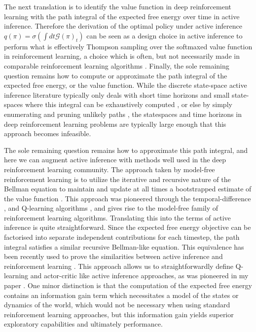 The next translation is to identify the value function in deep reinforcement learning with the path integral of the expected free energy over time in active inference. Therefore the derivation of the optimal policy under active inference $q(\pi) = \sigma(\int dt \mathcal{G}(\pi)_t)$ can be seen as a design choice in active inference to perform what is effectively Thompson sampling over the softmaxed value function in reinforcement learning, a choice which is often, but not necessarily made in comparable reinforcement learning algorithms \citep{osband2015bootstrapped}. Finally, the sole remaining question remains how to compute or approximate the path integral of the expected free energy, or the value function. While the discrete state-space active inference literature typically only deals with short time horizons and small state-spaces where this integral can be exhaustively computed \citep{da2020active}, or else by simply enumerating and pruning unlikely paths \citep{friston2020sophisticated}, the statespaces and time horizons in deep reinforcement learning problems are typically large enough that this approach becomes infeasible. 

The sole remaining question remains how to approximate this path integral, and here we can augment active inference with methods well used in the deep reinforcement learning community. The approach taken by model-free reinforcement learning is to utilize the iterative and recursive nature of the Bellman equation to maintain and update at all times a bootstrapped estimate of the value function \citep{kaelbling1996reinforcement,mnih2013playing}. This approach was pioneered through the temporal-difference \citep{sutton1988learning}, and Q-learning algorithms \citep{watkins1992q}, and gives rise to the model-free family of reinforcement learning algorithms. Translating this into the terms of active inference is quite straightforward. Since the expected free energy objective can be factorised into separate independent contributions for each timestep, the path integral satisfies a similar recursive Bellman-like equation. This equivalence has been recently used to prove the similarities between active inference and reinforcement learning \citep{da2020relationship}. This approach allows us to straightforwardly define Q-learning and actor-critic like active inference approaches, as was pioneered in my paper \citep{millidge2019deep}. One minor distinction is that the computation of the expected free energy contains an information gain term which necessitates a model of the states or dynamics of the world, which would not be necessary when using standard reinforcement learning approaches, but this information gain yields superior exploratory capabilities and ultimately performance.

